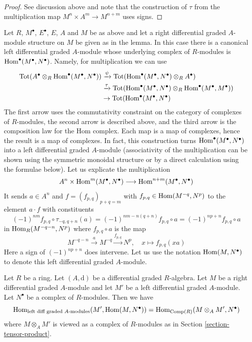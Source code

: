 \begin{proof}
See discussion above and note that the construction of $\tau$
from the multiplication map $M^n \times A^m \to M^{n + m}$
uses signs.
\end{proof}

\noindent
Let $R$, $M^\bullet$, $E^\bullet$, $E$, $A$ and $M$ be as above
and let a right differential graded $A$-module structure on $M$
be given as in the lemma. In this case there is a canonical left
differential graded $A$-module whose underlying complex of $R$-modules is
$\mathop{\mathrm{Hom}}\nolimits^\bullet(M^\bullet, N^\bullet)$. Namely, for multiplication
we can use
\begin{align*}
\text{Tot}(A^\bullet \otimes_R \mathop{\mathrm{Hom}}\nolimits^\bullet(M^\bullet, N^\bullet))
& \xrightarrow{\psi}
\text{Tot}(\mathop{\mathrm{Hom}}\nolimits^\bullet(M^\bullet, N^\bullet) \otimes_R A^\bullet) \\
& \xrightarrow{\tau}
\text{Tot}(\mathop{\mathrm{Hom}}\nolimits^\bullet(M^\bullet, N^\bullet) \otimes_R
\mathop{\mathrm{Hom}}\nolimits^\bullet(M^\bullet, M^\bullet)) \\
& \to
\text{Tot}(\mathop{\mathrm{Hom}}\nolimits^\bullet(M^\bullet, N^\bullet)
\end{align*}
The first arrow uses the commutativity constraint on the category
of complexes of $R$-modules, the second arrow is described above, and
the third arrow is the composition law for the Hom complex.
Each map is a map of complexes, hence the result is a map of complexes.
In fact, this construction turns $\mathop{\mathrm{Hom}}\nolimits^\bullet(M^\bullet, N^\bullet)$
into a left differential graded $A$-module (associativity of the multiplication
can be shown using the symmetric monoidal structure or by a direct calculation
using the formulae below). Let us explicate the multiplication
$$
A^n \times \mathop{\mathrm{Hom}}\nolimits^m(M^\bullet, N^\bullet) \longrightarrow
\mathop{\mathrm{Hom}}\nolimits^{n + m}(M^\bullet, N^\bullet)
$$
It sends $a \in A^n$ and
$f = (f_{p, q})_{p + q = m}$ with $f_{p, q} \in \mathop{\mathrm{Hom}}\nolimits(M^{-q}, N^p)$
to the element $a \cdot f$ with constituents
$$
(-1)^{nm}f_{p, q} \circ \tau_{-q, q + n}(a) =
(-1)^{nm - n(q + n)}f_{p, q} \circ a =
(-1)^{np + n} f_{p, q} \circ a
$$
in $\mathop{\mathrm{Hom}}\nolimits_R(M^{-q - n}, N^p)$ where $f_{p, q} \circ a$ is the map
$$
M^{-q - n} \xrightarrow{a} M^{-q} \xrightarrow{f_{p, q}} N^p,\quad
x \longmapsto f_{p, q}(xa)
$$
Here a sign of $(-1)^{np + n}$ does intervene.  Let us use the notation
$\mathop{\mathrm{Hom}}\nolimits(M, N^\bullet)$ to denote this left differential graded $A$-module.

\begin{lemma}
\label{lemma-characterize-hom-other-side}
Let $R$ be a ring. Let $(A, \text{d})$ be a differential graded $R$-algebra.
Let $M$ be a right differential graded $A$-module and let
$M'$ be a left differential graded $A$-module.
Let $N^\bullet$ be a complex of $R$-modules. Then we have
$$
\mathop{\mathrm{Hom}}\nolimits_{\text{left diff graded }A\text{-modules}}(M', \mathop{\mathrm{Hom}}\nolimits(M, N^\bullet)) =
\mathop{\mathrm{Hom}}\nolimits_{\text{Comp}(R)}(M \otimes_A M', N^\bullet)
$$
where $M \otimes_A M'$ is viewed as a complex of $R$-modules
as in Section \ref{section-tensor-product}.
\end{lemma}

